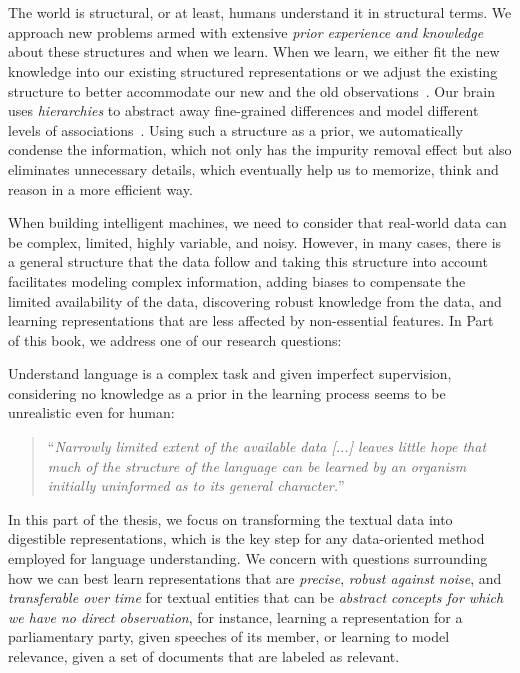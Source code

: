 \part{}
\label{part1}
%
The world is structural, or at least, humans understand it in structural terms. We approach new problems armed with extensive \emph{prior experience and knowledge} about these structures and when we learn. 
When we learn, we either fit the new knowledge into our existing structured representations or we adjust the existing structure to better accommodate our new and the old observations~\citep{battaglia2018relational}.
%
Our brain uses \emph{hierarchies} to abstract away fine-grained differences and model different levels of associations~\citep{Ballard:2015}. Using such a structure as a prior, we automatically condense the information, which not only has the impurity removal effect but also eliminates unnecessary details, which eventually help us to memorize, think and reason in a more efficient way.

When building intelligent machines, we need to consider that real-world data can be complex, limited, highly variable, and noisy. However, in many cases, there is a general structure that the data follow and taking this structure into account facilitates modeling complex information, adding biases to compensate the limited availability of the data, discovering robust knowledge from the data, and learning representations that are less affected by non-essential features. 
%
In Part~\ref{part1} of this book, we address one of our research questions:

Understand language is a complex task and given imperfect supervision, considering no knowledge as a prior in the learning process seems to be unrealistic even for human: 
\begin{quote}
    ``\emph{Narrowly limited extent of the available data [...] leaves little hope that much of the structure of the language can be learned by an organism initially uninformed as to its general character.}''~\citet{chomsky1965}
\end{quote}

In this part of the thesis, we focus on transforming the textual data into digestible representations, which is the key step for any data-oriented method~\citep{Bengio:2013} employed for language understanding. 
We concern with questions surrounding how we can best learn representations that are \emph{precise}, \emph{robust against noise}, and \emph{transferable over time} for textual entities that can be \emph{abstract concepts for which we have no direct observation}, for instance, learning a representation for a parliamentary party, given speeches of its member, or learning to model relevance, given a set of documents that are labeled as relevant.


